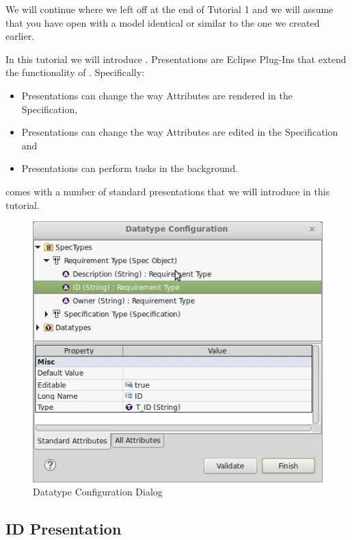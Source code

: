 We will continue where we left off at the end of Tutorial 1 and we will assume that you have \pror{} open with a model identical or similar to the one we created earlier.

In this tutorial we will introduce .  Presentations are Eclipse Plug-Ins that extend the functionality of \pror{}.  Specifically:

\begin{itemize}
\item
  Presentations can change the way Attributes are rendered in the Specification,
\item
  Presentations can change the way Attributes are edited in the Specification and
\item
  Presentations can perform tasks in the background.
\end{itemize}

\pror{} comes with a number of standard presentations that we will introduce in this tutorial.

\begin{figure}
\centering      
\includegraphics[width=0.8\linewidth]{../rmf-images/t_id.png}      
\caption{Datatype Configuration Dialog}      
\label{fig:datatypeConfig}
\end{figure}

\subsection{ID Presentation}
\label{sec:id-presentation}

